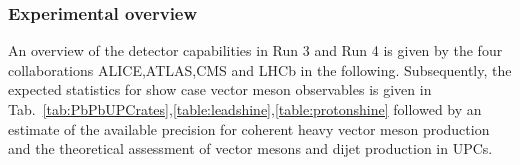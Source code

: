 \documentclass[../report.tex]{subfiles}
\begin{document}
\subsubsection{Experimental overview}
An overview of the detector capabilities in Run 3 and Run 4 is given by the four collaborations ALICE,ATLAS,CMS and LHCb in the following. Subsequently, the expected statistics for show case vector meson observables is given in Tab.~\ref{tab:PbPbUPCrates},\ref{table:leadshine},\ref{table:protonshine} followed by an estimate of the available precision for coherent heavy vector meson production and the theoretical assessment of vector mesons and dijet production in UPCs.
\end{document}
